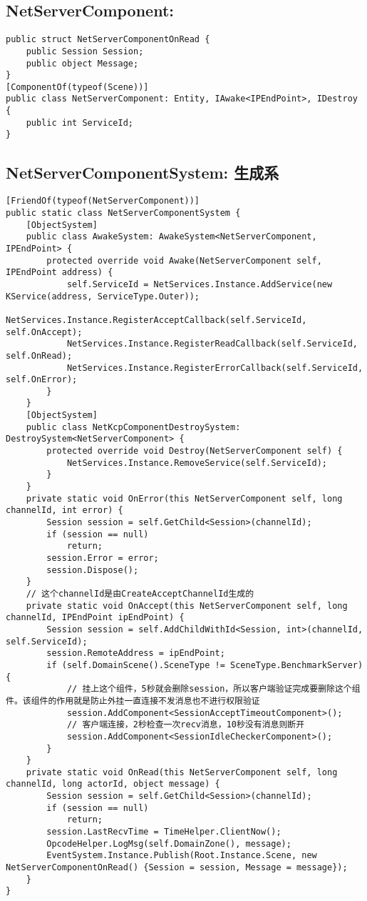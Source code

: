\documentclass[9pt, b5paper]{article}
\begin{document}
\subsection{NetServerComponent:}
\label{sec-1-3}
\begin{verbatim}
public struct NetServerComponentOnRead {
    public Session Session;
    public object Message;
}
[ComponentOf(typeof(Scene))]
public class NetServerComponent: Entity, IAwake<IPEndPoint>, IDestroy {
    public int ServiceId;
}
\end{verbatim}
\subsection{NetServerComponentSystem: 生成系}
\label{sec-1-4}
\begin{verbatim}
[FriendOf(typeof(NetServerComponent))]
public static class NetServerComponentSystem {
    [ObjectSystem]
    public class AwakeSystem: AwakeSystem<NetServerComponent, IPEndPoint> {
        protected override void Awake(NetServerComponent self, IPEndPoint address) {
            self.ServiceId = NetServices.Instance.AddService(new KService(address, ServiceType.Outer));
            NetServices.Instance.RegisterAcceptCallback(self.ServiceId, self.OnAccept);
            NetServices.Instance.RegisterReadCallback(self.ServiceId, self.OnRead);
            NetServices.Instance.RegisterErrorCallback(self.ServiceId, self.OnError);
        }
    }
    [ObjectSystem]
    public class NetKcpComponentDestroySystem: DestroySystem<NetServerComponent> {
        protected override void Destroy(NetServerComponent self) {
            NetServices.Instance.RemoveService(self.ServiceId);
        }
    }
    private static void OnError(this NetServerComponent self, long channelId, int error) {
        Session session = self.GetChild<Session>(channelId);
        if (session == null) 
            return;
        session.Error = error;
        session.Dispose();
    }
    // 这个channelId是由CreateAcceptChannelId生成的
    private static void OnAccept(this NetServerComponent self, long channelId, IPEndPoint ipEndPoint) {
        Session session = self.AddChildWithId<Session, int>(channelId, self.ServiceId);
        session.RemoteAddress = ipEndPoint;
        if (self.DomainScene().SceneType != SceneType.BenchmarkServer) {
            // 挂上这个组件，5秒就会删除session，所以客户端验证完成要删除这个组件。该组件的作用就是防止外挂一直连接不发消息也不进行权限验证
            session.AddComponent<SessionAcceptTimeoutComponent>();
            // 客户端连接，2秒检查一次recv消息，10秒没有消息则断开
            session.AddComponent<SessionIdleCheckerComponent>();
        }
    }
    private static void OnRead(this NetServerComponent self, long channelId, long actorId, object message) {
        Session session = self.GetChild<Session>(channelId);
        if (session == null) 
            return;
        session.LastRecvTime = TimeHelper.ClientNow();
        OpcodeHelper.LogMsg(self.DomainZone(), message);
        EventSystem.Instance.Publish(Root.Instance.Scene, new NetServerComponentOnRead() {Session = session, Message = message});
    }
}
\end{verbatim}
\end{document}
